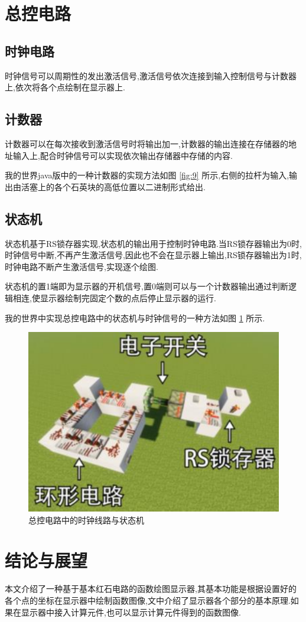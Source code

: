 \documentclass[UTF8,12pt,punct=kaiming,fontset=none]{article}
\begin{document}
    \section{总控电路}
    \subsection{时钟电路}
    时钟信号可以周期性的发出激活信号,激活信号依次连接到输入控制信号与计数器上,依次将各个点绘制在显示器上.

    \subsection{计数器}
    计数器可以在每次接收到激活信号时将输出加一,计数器的输出连接在存储器的地址输入上,配合时钟信号可以实现依次输出存储器中存储的内容.
    
    我的世界java版中的一种计数器的实现方法如图 \ref{fig:9} 所示,右侧的拉杆为输入,输出由活塞上的各个石英块的高低位置以二进制形式给出.

    \subsection{状态机}
    状态机基于RS锁存器实现,状态机的输出用于控制时钟电路.当RS锁存器输出为0时,时钟信号中断,不再产生激活信号,因此也不会在显示器上输出,RS锁存器输出为1时,时钟电路不断产生激活信号,实现逐个绘图.
    
    状态机的置1端即为显示器的开机信号,置0端则可以与一个计数器输出通过判断逻辑相连,使显示器绘制完固定个数的点后停止显示器的运行.
    
    我的世界中实现总控电路中的状态机与时钟信号的一种方法如图 \ref{fig:10} 所示.

    \begin{figure}[H]
        \centering
        \includegraphics[width=0.25\linewidth]{figures/10.png}
        \caption{总控电路中的时钟线路与状态机}
        \label{fig:10}
    \end{figure}

    \section{结论与展望}
    本文介绍了一种基于基本红石电路的函数绘图显示器,其基本功能是根据设置好的各个点的坐标在显示器中绘制函数图像,文中介绍了显示器各个部分的基本原理.如果在显示器中接入计算元件,也可以显示计算元件得到的函数图像.
\end{document}
